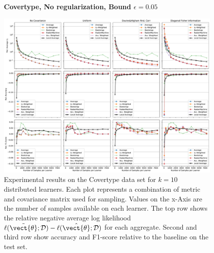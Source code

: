     \begin{landscape}
    \begin{figure}
        \centering
        \textbf{Covertype, No regularization, Bound $\epsilon=0.05$}\par\medskip
        \includegraphics[height=\dimexpr \textheight - 4\baselineskip\relax]{kapitel/figures/covertype_None_0.05_neg_relative.pdf}
        \caption[Covertype without regularization and $\epsilon=0.05$]{Experimental results on the Covertype data set for $k=10$ distributed learners. Each plot represents a combination of metric and covariance matrix used for sampling. Values on the x-Axis are the number of samples available on each learner. The top row shows the relative negative average log likelihood $\ell(\tilde{\vect{\theta}}; \mathcal{D}) - \ell(\hat{\vect{\theta}}; \mathcal{D})$ for each aggregate. Second and third row show accuracy and F1-score relative to the baseline on the test set.}
        \label{fig:analysis8}
    \end{figure}
    \end{landscape}
